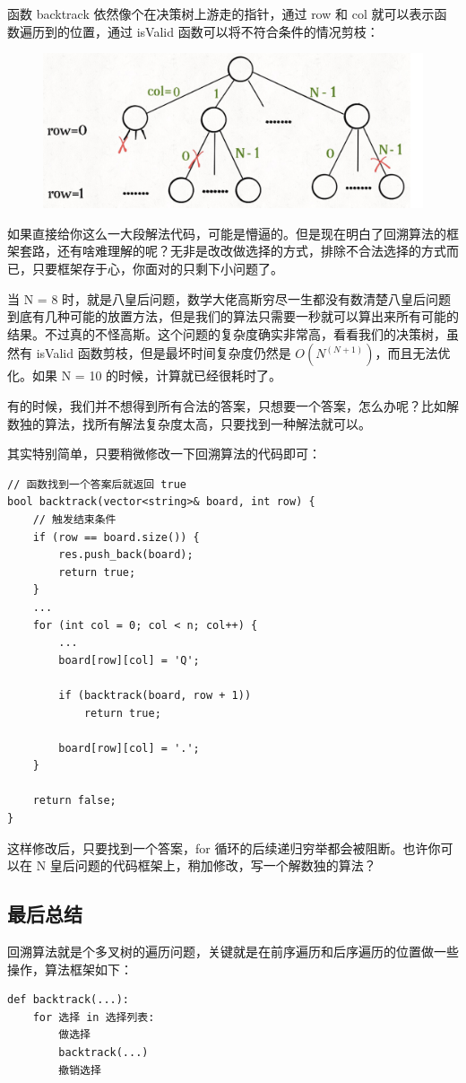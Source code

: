 \documentclass[12pt]{article}
\begin{document}
函数 backtrack 依然像个在决策树上游走的指针，通过 row 和 col 就可以表示函数遍历到的位置，通过 isValid 函数可以将不符合条件的情况剪枝：
\begin{figure}[H]
    \centering
    \includegraphics[width=.5\textwidth]{fig/Backtrack_7.png}
\end{figure}

如果直接给你这么一大段解法代码，可能是懵逼的。但是现在明白了回溯算法的框架套路，还有啥难理解的呢？无非是改改做选择的方式，排除不合法选择的方式而已，只要框架存于心，你面对的只剩下小问题了。

当 N = 8 时，就是八皇后问题，数学大佬高斯穷尽一生都没有数清楚八皇后问题到底有几种可能的放置方法，但是我们的算法只需要一秒就可以算出来所有可能的结果。不过真的不怪高斯。这个问题的复杂度确实非常高，看看我们的决策树，虽然有 isValid 函数剪枝，但是最坏时间复杂度仍然是 $O(N^(N+1))$，而且无法优化。如果 N = 10 的时候，计算就已经很耗时了。

有的时候，我们并不想得到所有合法的答案，只想要一个答案，怎么办呢？比如解数独的算法，找所有解法复杂度太高，只要找到一种解法就可以。

其实特别简单，只要稍微修改一下回溯算法的代码即可：
\begin{lstlisting}
// 函数找到一个答案后就返回 true
bool backtrack(vector<string>& board, int row) {
    // 触发结束条件
    if (row == board.size()) {
        res.push_back(board);
        return true;
    }
    ...
    for (int col = 0; col < n; col++) {
        ...
        board[row][col] = 'Q';

        if (backtrack(board, row + 1))
            return true;
        
        board[row][col] = '.';
    }

    return false;
}
\end{lstlisting}

这样修改后，只要找到一个答案，for 循环的后续递归穷举都会被阻断。也许你可以在 N 皇后问题的代码框架上，稍加修改，写一个解数独的算法？

\subsection{最后总结}
回溯算法就是个多叉树的遍历问题，关键就是在前序遍历和后序遍历的位置做一些操作，算法框架如下：
\begin{lstlisting}
def backtrack(...):
    for 选择 in 选择列表:
        做选择
        backtrack(...)
        撤销选择
\end{lstlisting}
\end{document}
